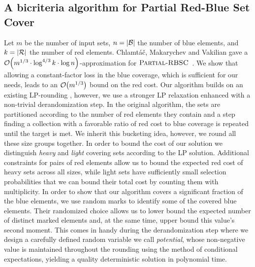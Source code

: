 \subsection{A bicriteria algorithm for Partial Red-Blue Set Cover}
\label{subsection:PRBSC-bicriteria}
Let $m$ be the number of input sets, $n=\mathopen{}\left| \mathcal{B} \right|$ the number of blue elements, and $k=\mathopen{}\left| \mathcal{R} \right|$ the number of red elements. Chlamt{\'{a}}{\v{c}}, Makarychev and Vakilian gave a $\mathcal{O}\mathopen{}\left( m^{1/3}\cdot \log^{4/3}k\cdot \log n \right)$-approximation for $\textup{\textsc{Partial-RBSC}}$~\cite[Section~3 and Appendix~A]{RedBlueSetCover}. We show that allowing a constant-factor loss in the blue coverage, which is sufficient for our needs, leads to an $\mathcal{O}\mathopen{}\left( m^{1/3} \right)$ bound on the red cost.
Our algorithm builds on an existing LP-rounding \cite{RedBlueSetCover}, however, we use a stronger LP relaxation enhanced with a non-trivial derandomization step. In the original algorithm, the sets are partitioned according to the number of red elements they contain and a step finding a collection with a favorable ratio of red cost to blue coverage is repeated until the target is met. We inherit this bucketing idea, however, we round all these size groups together. In order to bound the cost of our solution we distinguish \emph{heavy} and \emph{light} covering sets according to the LP solution. Additional constraints for pairs of red elements allow us to bound the expected red cost of heavy sets across all sizes, while light sets have sufficiently small selection probabilities that we can bound their total cost by counting them with multiplicity. In order to show that our algorithm covers a significant fraction of the blue elements, we use random marks to identify some of the covered blue elements. Their randomized choice allows us to lower bound the expected number of distinct marked elements and, at the same time, upper bound this value's second moment. This comes in handy during the derandomization step where we design a carefully defined random variable we call \emph{potential}, whose non-negative value is maintained throughout the rounding using the method of conditional expectations, yielding a quality deterministic solution in polynomial time.

